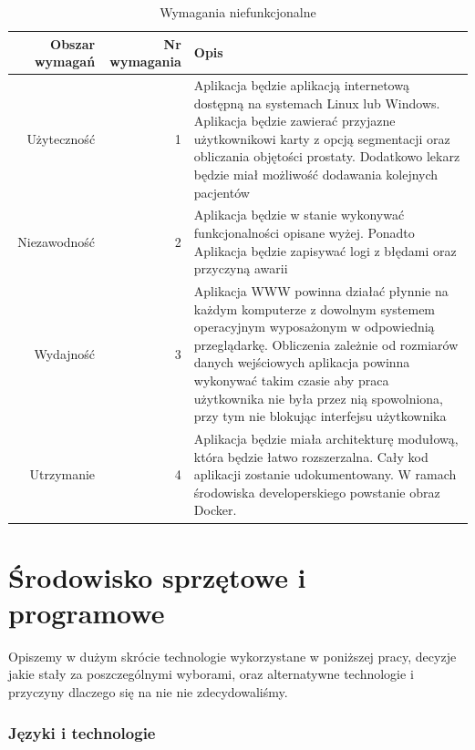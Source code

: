 \documentclass[a4paper,11pt,twoside]{report}
\theoremstyle{definition}
\begin{document}
\begin{table}[h!]
\caption{Wymagania niefunkcjonalne}
\centering
\begin{tabular}{|r|r|p{10cm}|} \hline 
	Obszar wymagań & Nr wymagania & Opis \\ \hline 
	Użyteczność & 1 & Aplikacja będzie aplikacją internetową dostępną na systemach Linux lub Windows. Aplikacja będzie zawierać przyjazne użytkownikowi karty z opcją segmentacji oraz obliczania objętości prostaty. Dodatkowo lekarz będzie miał możliwość dodawania kolejnych pacjentów \\ \hline 
	Niezawodność & 2 & Aplikacja będzie w stanie wykonywać funkcjonalności opisane wyżej. Ponadto Aplikacja będzie zapisywać logi z błędami oraz przyczyną awarii \\ \hline 
	Wydajność & 3 & Aplikacja WWW powinna działać płynnie na każdym
komputerze z dowolnym systemem operacyjnym wyposażonym
w odpowiednią przeglądarkę. Obliczenia zależnie od rozmiarów danych wejściowych aplikacja powinna wykonywać takim czasie aby praca użytkownika nie była przez nią spowolniona, przy tym nie blokując interfejsu użytkownika \\ \hline 
	Utrzymanie & 4 & Aplikacja będzie miała architekturę modułową, która będzie łatwo rozszerzalna. Cały kod aplikacji zostanie udokumentowany. W ramach środowiska developerskiego powstanie obraz Docker.  \\ \hline 
\end{tabular}
\label{Wymagania niefunkcjonalne}
\end{table}

\section{Środowisko sprzętowe i programowe}

Opiszemy w dużym skrócie technologie wykorzystane w poniższej pracy, decyzje jakie stały za poszczególnymi wyborami, oraz alternatywne technologie i przyczyny dlaczego się na nie nie zdecydowaliśmy. 

\subsubsection{Języki i technologie }
\end{document}

